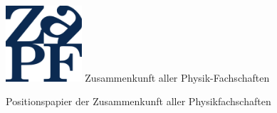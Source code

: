 \documentclass[DIV=calc]{scrartcl}
\begin{document}
    \hspace{0.87\textwidth}
    \begin{minipage}{120pt}
        \vspace{-1.8cm}
        \includegraphics[width=80pt]{../../logo.pdf}
        \centering
        \small Zusammenkunft aller Physik-Fachschaften
    \end{minipage}
    \begin{center}
        \huge{Positionspapier der Zusammenkunft aller Physikfachschaften}\vspace{.25\baselineskip}\\
        \normalsize
    \end{center}
    \vspace{0cm} 
       
\end{document}
